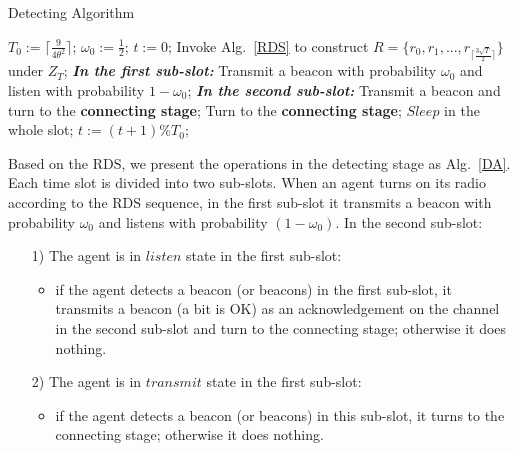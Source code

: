 \begin{algorithm}[!h]
    \caption{Detecting Algorithm}
    \label{DA}
    \begin{algorithmic}[1]
    \STATE $T_0 := \lceil \frac{9}{4\theta^{2}} \rceil$; $\omega_0 :=\frac{1}{2}$; $t := 0$;
    \STATE Invoke Alg.~\ref{RDS} to construct $R = \{r_0, r_1, ...,r_{\lceil 
    \frac{3\sqrt{T}}{2}  \rceil}\}$ under $Z_T$;
          \label{On}
            \STATE \textbf{\emph{In the first sub-slot:}}
            \STATE Transmit a beacon with probability $\omega_0$
            and listen with probability $1-\omega_0$;
            \STATE \textbf{\emph{In the second sub-slot:}}
                    \STATE Transmit a beacon and turn to the \textbf{connecting stage};
                \ENDIF
                \STATE Turn to the \textbf{connecting stage};
            \ENDIF
        \ELSE
                \STATE $Sleep$ in the whole slot;
        \ENDIF
        \STATE $t := (t + 1) \% T_0$;
    \ENDWHILE
    \end{algorithmic}
\end{algorithm}

Based on the RDS, we present the operations in the detecting stage as Alg.~\ref{DA}.
Each time slot is divided into two sub-slots.
When an agent turns on its radio according to the RDS sequence,
in the first sub-slot
it transmits a beacon with probability $\omega_0$ and listens with probability $(1-\omega_0)$.
In the second sub-slot: 
\begin{itemize}
    \item[1)] The agent is in $listen$ state in the first sub-slot:
    \begin{itemize}
    \item if the agent detects a beacon (or beacons) in the first sub-slot, it 
    transmits a beacon (a bit is OK) as an acknowledgement 
    on the channel in the second sub-slot and turn to the 
    connecting stage; otherwise it does nothing. 
    \end{itemize}
    \item[2)] The agent is in $transmit$ state in the first sub-slot:
    \begin{itemize}
    \item if the agent detects a beacon (or beacons) in this sub-slot,
    it turns to the connecting stage; otherwise it does nothing.
    \end{itemize}
\end{itemize}

